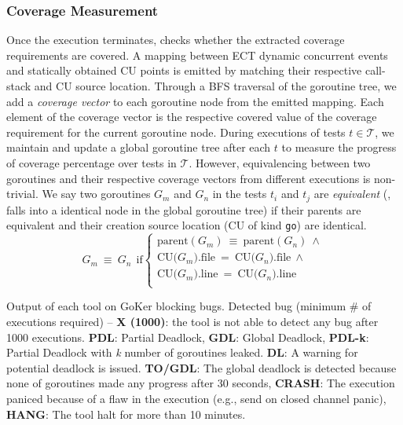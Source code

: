 \subsubsection{Coverage Measurement}
Once the execution terminates, \goat checks whether the extracted coverage requirements are covered.
%
A mapping between ECT dynamic concurrent events and statically obtained CU points is emitted by matching their respective call-stack and CU source location.
%
Through a BFS traversal of the goroutine tree, we add a \textit{coverage vector} to each goroutine node from the emitted mapping.
%
Each element of the coverage vector is the respective covered value of the coverage requirement for the current goroutine node.
%
During executions of tests $t \in \mathcal{T}$, we maintain and update a global goroutine tree after each $t$ to measure the progress of coverage percentage over tests in $\mathcal{T}$.
%
However, equivalencing between two goroutines and their respective coverage vectors from different executions is non-trivial.
%
We say two goroutines $G_m$ and $G_n$ in the tests $t_i$ and $t_j$ are \textit{equivalent} (\ie, falls into a identical node in the global goroutine tree) if their parents are equivalent and their creation source location (CU of kind \texttt{go}) are identical.
%
\begin{equation}
  G_m~\equiv~G_n~~\text{if}
  \begin{cases}
    \text{parent}(G_m)~\equiv~\text{parent}(G_n)~\wedge \\
    \text{CU(}G_m\text{).file}~=~\text{CU(}G_n\text{).file}~\wedge\\
    \text{CU(}G_m\text{).line}~=~\text{CU(}G_n\text{).line}~\\
  \end{cases}
\end{equation}


\begin{table}[]
\caption{Output of each tool on GoKer \cite{yuan-gobench-cgo21} blocking bugs. Detected bug (minimum \# of executions required) -- \textbf{X (1000)}: the tool is not able to detect any bug after 1000 executions. \textbf{PDL}: Partial Deadlock, \textbf{GDL}: Global Deadlock, \textbf{PDL-k}: Partial Deadlock with \textit{k} number of goroutines leaked. \textbf{DL}: A warning for potential deadlock is issued. \textbf{TO/GDL}: The global deadlock is detected because none of goroutines made any progress after 30 seconds, \textbf{CRASH}: The execution paniced because of a flaw in the execution (e.g., send on closed channel panic), \textbf{HANG}: The tool halt for more than 10 minutes.}
\centering
\scalebox{0.72}{
    
  }
\label{tab:comparison}
\end{table}
